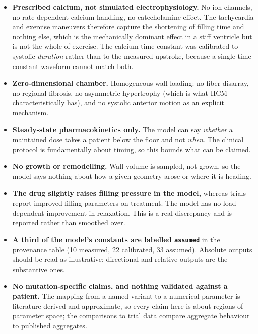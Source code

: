 \documentclass[11pt,a4paper]{article}
\begin{document}
\begin{itemize}[nosep,leftmargin=1.1em]
  \item \textbf{Prescribed calcium, not simulated electrophysiology.} No ion channels, no
        rate-dependent calcium handling, no catecholamine effect. The tachycardia and
        exercise maneuvers therefore capture the shortening of filling time and nothing
        else, which is the mechanically dominant effect in a stiff ventricle but is not the
        whole of exercise. The calcium time constant was calibrated to systolic
        \emph{duration} rather than to the measured upstroke, because a single-time-constant
        waveform cannot match both.
  \item \textbf{Zero-dimensional chamber.} Homogeneous wall loading: no fiber disarray, no
        regional fibrosis, no asymmetric hypertrophy (which is what HCM characteristically
        has), and no systolic anterior motion as an explicit mechanism.
  \item \textbf{Steady-state pharmacokinetics only.} The model can say \emph{whether} a
        maintained dose takes a patient below the floor and not \emph{when}. The clinical
        protocol is fundamentally about timing, so this bounds what can be claimed.
  \item \textbf{No growth or remodelling.} Wall volume is sampled, not grown, so the model
        says nothing about how a given geometry arose or where it is heading.
  \item \textbf{The drug slightly raises filling pressure in the model,} whereas trials report
        improved filling parameters on treatment. The model has no load-dependent improvement
        in relaxation. This is a real discrepancy and is reported rather than smoothed over.
  \item \textbf{A third of the model's constants are labelled \texttt{assumed}} in the
        provenance table (10 measured, 22 calibrated, 33 assumed). Absolute outputs should be
        read as illustrative; directional and relative outputs are the substantive ones.
  \item \textbf{No mutation-specific claims, and nothing validated against a patient.} The
        mapping from a named variant to a numerical parameter is literature-derived and
        approximate, so every claim here is about regions of parameter space; the comparisons
        to trial data compare aggregate behaviour to published aggregates.
\end{itemize}
\end{document}
